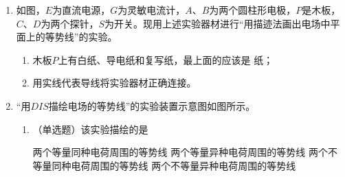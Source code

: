 

\begin{enumerate}[leftmargin=0em]
\renewcommand{\labelenumi}{\arabic{enumi}.}
\item
{}
如图，$ E $为直流电源，$ G $为灵敏电流计，$ A $、$ B $为两个圆柱形电极，$ P $是木板，$ C $、$ D $为两个探针，$ S $为开关。现用上述实验器材进行“用描迹法画出电场中平面上的等势线”的实验。
\begin{enumerate}
\renewcommand{\labelenumi}{\arabic{enumi}.}
\item
木板$ P $上有白纸、导电纸和复写纸，最上面的应该是  纸；
\item 
用实线代表导线将实验器材正确连接。

\end{enumerate}
\begin{figure}[h!]
\centering

\end{figure}




\item 
{}
“用$ DIS $描绘电场的等势线”的实验装置示意图如图所示。
\begin{enumerate}
\renewcommand{\labelenumi}{\arabic{enumi}.}
\item
（单选题）该实验描绘的是  

\begin{minipage}[h!]{0.7\linewidth}
\vspace{0.3em}
\fourchoices
{两个等量同种电荷周围的等势线}
{两个等量异种电荷周围的等势线}
{两个不等量同种电荷周围的等势线}
{两个不等量异种电荷周围的等势线}
\vspace{0.3em}
\end{minipage}
\hfill
\begin{minipage}[h!]{0.3\linewidth}
\flushright
\vspace{0.3em}

\vspace{0.3em}
\end{minipage}






\end{enumerate}
\end{enumerate}
